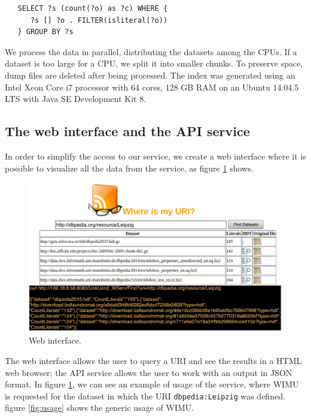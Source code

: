 \begin{verbatim}
   SELECT ?s (count(?o) as ?c) WHERE {
      ?s [] ?o . FILTER(isliteral(?o))  
   } GROUP BY ?s
\end{verbatim}

We process the data in parallel, distributing the datasets among the CPUs. 
If a dataset is too large for a CPU, we split it into smaller chunks.
To preserve space, dump files are deleted after being processed.
The index was generated using an Intel Xeon Core i7 processor with 64 cores, 128 GB RAM on an Ubuntu 14.04.5 LTS with Java SE Development Kit 8. %

\subsection{The web interface and the API service}

In order to simplify the access to our service, we create a web interface where it is possible to visualize all the data from the service, as figure \ref{fig:web} shows. 

\begin{figure}[htb] 
	\centering
	\includegraphics[width=350pt]{img/web.pdf}
	\caption{Web interface.}
	\label{fig:web}
\end{figure}

The web interface allows the user to query a URI and see the results in a HTML web browser; the API service allows the user to work with an output in JSON format. %
In figure \ref{fig:web}, we can see an example of usage of the service, where WIMU is requested for the dataset in which the URI \texttt{dbpedia:Leipzig} was defined.
figure \ref{fig:usage} shows the generic usage of WIMU.



